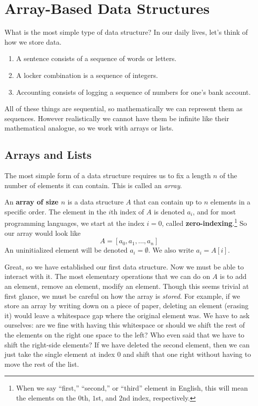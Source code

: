 \section{Array-Based Data Structures} 

  What is the most simple type of data structure? In our daily lives, let's think of how we store data. 
  \begin{enumerate}
    \item A sentence consists of a sequence of words or letters. 
    \item A locker combination is a sequence of integers. 
    \item Accounting consists of logging a sequence of numbers for one's bank account. 
  \end{enumerate} 

  All of these things are sequential, so mathematically we can represent them as sequences. However realistically we cannot have them be infinite like their mathematical analogue, so we work with arrays or lists.  

\subsection{Arrays and Lists} 

  The most simple form of a data structure requires us to fix a length $n$ of the number of elements it can contain. This is called an \textit{array}. 

  \begin{definition}[Array]
    An \textbf{array of size $n$} is a data structure $A$ that can contain up to $n$ elements in a specific order. The element in the $i$th index of $A$ is denoted $a_i$, and for most programming languages, we start at the index $i=0$, called \textbf{zero-indexing}.\footnote{When we say ``first,'' ``second,'' or ``third'' element in English, this will mean the elements on the $0$th, $1$st, and $2$nd index, respectively.} So our array would look like
    \begin{equation}
      A = [a_0, a_1, \ldots, a_n]
    \end{equation} 
    An uninitialized element will be denoted $a_i = \emptyset$. We also write $a_i = A[i]$. 
  \end{definition} 

  Great, so we have established our first data structure. Now we must be able to interact with it. The most elementary operations that we can do on $A$ is to add an element, remove an element, modify an element. Though this seems trivial at first glance, we must be careful on how the array is \textit{stored}. For example, if we store an array by writing down on a piece of paper, deleting an element (erasing it) would leave a whitespace gap where the original element was. We have to ask ourselves: are we fine with having this whitespace or should we shift the rest of the elements on the right one space to the left? Who even said that we have to shift the right-side elements? If we have deleted the second element, then we can just take the single element at index $0$ and shift that one right without having to move the rest of the list. 

